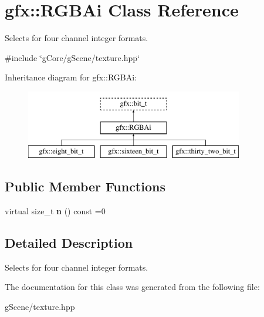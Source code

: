 \hypertarget{classgfx_1_1RGBAi}{\section{gfx\-:\-:R\-G\-B\-Ai Class Reference}
\label{classgfx_1_1RGBAi}
}


Selects for four channel integer formats.  




{\ttfamily \#include \char`\"{}g\-Core/g\-Scene/texture.\-hpp\char`\"{}}

Inheritance diagram for gfx\-:\-:R\-G\-B\-Ai\-:\begin{figure}[H]
\begin{center}
\leavevmode
\includegraphics[height=3.000000cm]{classgfx_1_1RGBAi}
\end{center}
\end{figure}
\subsection*{Public Member Functions}
\begin{DoxyCompactItemize}
\item 
\hypertarget{classgfx_1_1RGBAi_a9540c83f0596401fda7acffbe0badb76}{virtual size\-\_\-t {\bfseries n} () const =0}\label{classgfx_1_1RGBAi_a9540c83f0596401fda7acffbe0badb76}

\end{DoxyCompactItemize}


\subsection{Detailed Description}
Selects for four channel integer formats. 

The documentation for this class was generated from the following file\-:\begin{DoxyCompactItemize}
\item 
g\-Scene/texture.\-hpp\end{DoxyCompactItemize}

